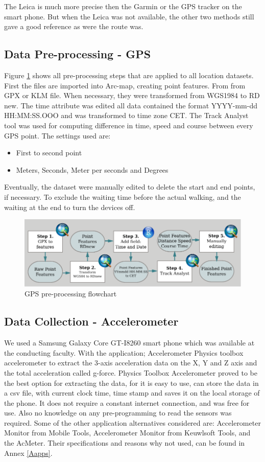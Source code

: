 The Leica is much more precise then the Garmin or the GPS tracker on the smart phone. But when the Leica was not available, the other two methods still gave a good reference as were the route was. 

\subsection{Data Pre-processing - GPS }
Figure \ref{gpspp} shows all pre-processing steps that are applied to all location datasets. First the files are imported  into Arc-map, creating point features. From from GPX or KLM file. When necessary, they were transformed from WGS1984 to RD new. The time attribute was edited all data contained the format YYYY-mm-dd HH:MM:SS.OOO and was transformed to time zone CET. The Track Analyst tool was used for computing difference in time, speed and course between every GPS point. The settings used are: 
\begin{itemize}
 \item First to second point
 \item Meters, Seconds, Meter per seconds and Degrees
\end{itemize}
Eventually, the dataset were manually edited to delete the start and end points, if necessary. To exclude the waiting time before the actual walking, and the waiting at the end to turn the devices off. 

\begin{figure}[hb]
\includegraphics[width=\textwidth]{img/M_preprocessingGPS.pdf}
\centering
\caption{GPS pre-processing flowchart}
\label{gpspp}
\end{figure}

\subsection{Data Collection - Accelerometer}
We used a Samsung Galaxy Core GT-I8260 smart phone which was available at the conducting faculty. With the application; Accelerometer Physics toolbox accelerometer to extract the 3-axis acceleration data on the X, Y and Z axis and the total acceleration called g-force. Physics Toolbox Accelerometer proved to be the best option for extracting the data, for it is easy to use, can store the data in a csv file, with current clock time, time stamp and saves it on the local storage of the phone. It does not require a constant internet connection, and was free for use. Also no knowledge on any pre-programming to read the sensors was required. Some of the other application alternatives considered are: Accelerometer Monitor from Mobile Tools, Accelerometer Monitor from Keuwlsoft Tools, and the AcMeter. Their specifications and reasons why not used, can be found in Annex \ref{Aapps}. 


